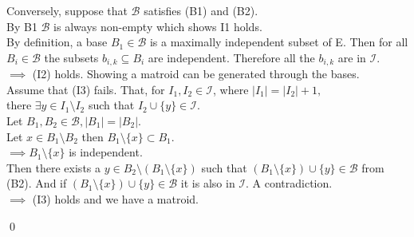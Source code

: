 \documentclass[../main.tex]{subfiles}
\begin{document}
\noindent Conversely, suppose that $\mathcal{B}$ satisfies (B1) and (B2).\\
\noindent By B1 $\mathcal{B}$ is always non-empty which shows I1 holds.
\\
\noindent By definition, a base $B_1 \in \mathcal{B}$ is a maximally independent subset of E. Then for all $B_i \in \mathcal{B}$ the subsets $b_{i,k} \subseteq B_i$  are independent. Therefore all the $b_{i,k}$ are in $\mathcal{I}.$\\ \noindent $\implies$ (I2) holds. Showing a matroid can be generated through the bases.
\\
\noindent Assume that (I3) fails. That, for $I_1, I_2 \in \mathcal{I}$, where $|I_1| = |I_2|+1,$\\ \noindent there $\exists y \in I_1 \setminus I_2$ such that $I_2 \cup \{y\} \in \mathcal{I}.$\\
\noindent Let $B_1, B_2 \in \mathcal{B}, |B_1| = |B_2|.$\\
\noindent Let $x \in B_1 \setminus B_2$ then $B_1 \setminus \{x\} \subset B_1.$ \\ \noindent $\implies B_1 \setminus \{x\}$ is independent.\\
\noindent Then there exists a $y \in B_2 \setminus (B_1 \setminus \{x\})$ such that $(B_1 \setminus \{x\}) \cup \{y\} \in \mathcal{B}$ from (B2). And if $(B_1 \setminus \{x\}) \cup \{y\} \in \mathcal{B}$ it is also in $\mathcal{I}$. A contradiction.\\ \noindent $\implies$ (I3) holds and we have a matroid.

\qed
\end{document}
